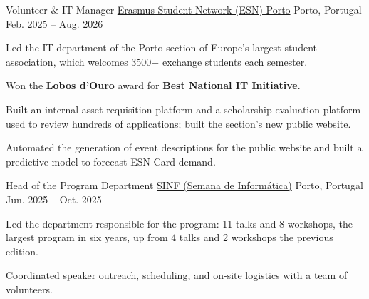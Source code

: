 

\begin{cventries}
      
       \cventry
          {Volunteer \& IT Manager} %
          {\href{https://esnporto.org/en}{Erasmus Student Network (ESN) Porto}} %
          {Porto, Portugal} %
          {Feb. 2025 -- Aug. 2026} %
          {
            \begin{cvitems}
                \item {Led the IT department of the Porto section of Europe's largest student association, which welcomes 3500+ exchange students each semester.}
                \item {Won the \textbf{Lobos d'Ouro} award for \textbf{Best National IT Initiative}.}
                \item {Built an internal asset requisition platform and a scholarship evaluation platform used to review hundreds of applications; built the section's new public website.}
                \item {Automated the generation of event descriptions for the public website and built a predictive model to forecast ESN Card demand.}
            \end{cvitems}
          }
          
    \cventry
      {Head of the Program Department} %
      {\href{https://web.archive.org/web/20251106235553/https://www.sinf.pt/}{SINF (Semana de Informática)}} %
      {Porto, Portugal} %
      {Jun. 2025 -- Oct. 2025} %
      {
        \begin{cvitems}
            \item {Led the department responsible for the program: 11 talks and 8 workshops, the largest program in six years, up from 4 talks and 2 workshops the previous edition.}
            \item {Coordinated speaker outreach, scheduling, and on-site logistics with a team of volunteers.}
        \end{cvitems}
      }
      

\end{cventries}
